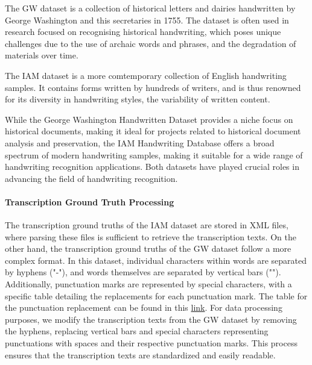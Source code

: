 The GW dataset is a collection of historical letters and dairies handwritten by George Washington and this secretaries in 1755. The dataset is often used in research focused on recognising historical handwriting, which poses unique challenges due to the use of archaic words and phrases, and the degradation of materials over time.

The IAM dataset is a more comtemporary collection of English handwriting samples. It contains forms written by hundreds of writers, and is thus renowned for its diversity in handwriting styles, the variability of written content. 

While the George Washington Handwritten Dataset provides a niche focus on historical documents, making it ideal for projects related to historical document analysis and preservation, the IAM Handwriting Database offers a broad spectrum of modern handwriting samples, making it suitable for a wide range of handwriting recognition applications. Both datasets have played crucial roles in advancing the field of handwriting recognition. 
\paragraph*{Transcription Ground Truth Processing}
\label{par:3_transcription_gound_truth_processing}
The transcription ground truths of the IAM dataset are stored in XML files, where parsing these files is sufficient to retrieve the transcription texts. On the other hand, the transcription ground truths of the GW dataset follow a more complex format. In this dataset, individual characters within words are separated by hyphens ("-"), and words themselves are separated by vertical bars ("\textbar"). Additionally, punctuation marks are represented by special characters, with a specific table detailing the replacements for each punctuation mark. The table for the punctuation replacement can be found in this \href{https://github.com/Yung-Hsin-Chen/master_thesis/blob/src/model/config/punctuation_list.json}{link}. 
For data processing purposes, we modify the transcription texts from the GW dataset by removing the hyphens, replacing vertical bars and special characters representing punctuations with spaces and their respective punctuation marks. This process ensures that the transcription texts are standardized and easily readable. 
